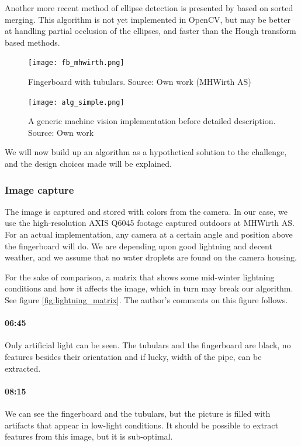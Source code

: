 Another more recent method of ellipse detection is presented by \citet{wang14} based on sorted merging. This algorithm is not yet implemented in OpenCV, but may be better at handling partial occlusion of the ellipses, and faster than the Hough transform based methods.

\begin{figure}[ht]
    \centering
    \texttt{[image: fb\_mhwirth.png]}
    \caption{Fingerboard with tubulars. Source: Own work (MHWirth AS)}
    \label{fig:fb_mhwirth}
\end{figure}
\FloatBarrier

\begin{figure}[ht]
    \centering
    \texttt{[image: alg\_simple.png]}
    \caption{A generic machine vision implementation before detailed description. Source: Own work}
    \label{fig:alg_simple}
\end{figure}
\FloatBarrier

We will now build up an algorithm as a hypothetical solution to the challenge, and the design choices made will be explained.

\subsubsection{Image capture}
The image is captured and stored with colors from the camera. In our case, we use the high-resolution AXIS Q6045 footage captured outdoors at MHWirth AS. For an actual implementation, any camera at a certain angle and position above the fingerboard will do. We are depending upon good lightning and decent weather, and we assume that no water droplets are found on the camera housing.

For the sake of comparison, a matrix that shows some mid-winter lightning conditions and how it affects the image, which in turn may break our algorithm. See figure \ref{fig:lightning_matrix}. The author's comments on this figure follows.

\paragraph{06:45} Only artificial light can be seen. The tubulars and the fingerboard are black, no features besides their orientation and if lucky, width of the pipe, can be extracted.

\paragraph{08:15} We can see the fingerboard and the tubulars, but the picture is filled with artifacts that appear in low-light conditions. It should be possible to extract features from this image, but it is sub-optimal.

